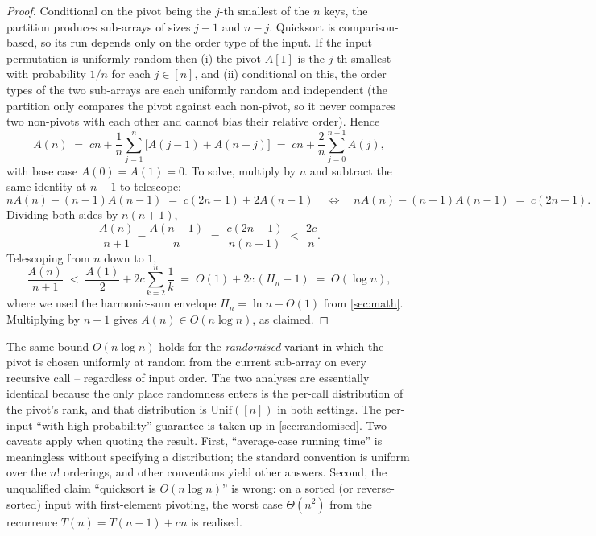 \begin{proof}
Conditional on the pivot being the $j$-th smallest of the $n$ keys, the partition produces sub-arrays of sizes $j-1$ and $n-j$. Quicksort is comparison-based, so its run depends only on the order type of the input. If the input permutation is uniformly random then (i) the pivot $A[1]$ is the $j$-th smallest with probability $1/n$ for each $j \in [n]$, and (ii) conditional on this, the order types of the two sub-arrays are each uniformly random and independent (the partition only compares the pivot against each non-pivot, so it never compares two non-pivots with each other and cannot bias their relative order). Hence
\[
  A(n) \;=\; cn + \frac{1}{n}\sum_{j=1}^{n}\!\bigl[A(j-1) + A(n-j)\bigr]
       \;=\; cn + \frac{2}{n}\sum_{j=0}^{n-1} A(j),
\]
with base case $A(0) = A(1) = 0$. To solve, multiply by $n$ and subtract the same identity at $n-1$ to telescope:
\[
  n A(n) - (n-1) A(n-1) \;=\; c(2n - 1) + 2 A(n-1)
  \quad\Longleftrightarrow\quad
  n A(n) - (n+1) A(n-1) \;=\; c(2n-1).
\]
Dividing both sides by $n(n+1)$,
\[
  \frac{A(n)}{n+1} - \frac{A(n-1)}{n} \;=\; \frac{c(2n-1)}{n(n+1)} \;<\; \frac{2c}{n}.
\]
Telescoping from $n$ down to $1$,
\[
  \frac{A(n)}{n+1} \;<\; \frac{A(1)}{2} + 2c\sum_{k=2}^{n}\frac{1}{k}
                 \;=\; O(1) + 2c\,(H_n - 1)
                 \;=\; O(\log n),
\]
where we used the harmonic-sum envelope $H_n = \ln n + \Theta(1)$ from \cref{sec:math}. Multiplying by $n+1$ gives $A(n) \in O(n \log n)$, as claimed.
\end{proof}

\begin{remark}
The same bound $O(n \log n)$ holds for the \emph{randomised} variant in which the pivot is chosen uniformly at random from the current sub-array on every recursive call -- regardless of input order. The two analyses are essentially identical because the only place randomness enters is the per-call distribution of the pivot's rank, and that distribution is $\mathrm{Unif}([n])$ in both settings. The per-input ``with high probability'' guarantee is taken up in \cref{sec:randomised}. Two caveats apply when quoting the result. First, ``average-case running time'' is meaningless without specifying a distribution; the standard convention is uniform over the $n!$ orderings, and other conventions yield other answers. Second, the unqualified claim ``quicksort is $O(n \log n)$'' is wrong: on a sorted (or reverse-sorted) input with first-element pivoting, the worst case $\Theta(n^2)$ from the recurrence $T(n) = T(n-1) + cn$ is realised.
\end{remark}

